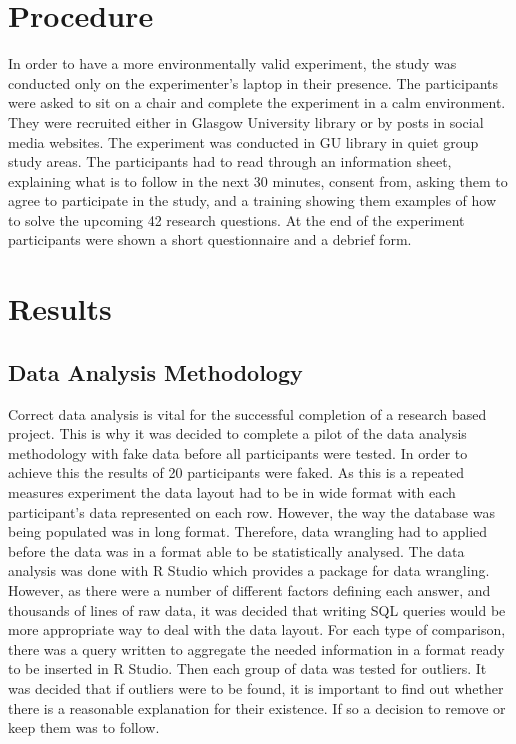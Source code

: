 \documentclass{l4proj}
\begin{document}
\section{Procedure}

In order to have a more environmentally valid experiment, the study was conducted only on the experimenter's laptop in their presence. The participants were asked to sit on a chair and complete the experiment in a calm environment. They were recruited either in Glasgow University library or by posts in social media websites. The experiment was conducted in GU library in quiet group study areas. The participants had to read through an information sheet, explaining what is to follow in the next 30 minutes, consent from, asking them to agree to participate in the study, and a training showing them examples of how to solve the upcoming 42 research questions. At the end of the experiment participants were shown a short questionnaire and a debrief form.


\section{Results}

\subsection{Data Analysis Methodology}

Correct data analysis is vital for the successful completion of a research based project. This is why it was decided to complete a pilot of the data analysis methodology with fake data before all participants were tested. In order to achieve this the results of 20 participants were faked. As this is a repeated measures experiment the data layout had to be in wide format with each participant's data represented on each row. However, the way the database was being populated was in long format. Therefore, data wrangling had to applied before the data was in a format able to be statistically analysed. The data analysis was done with R Studio which provides a package for data wrangling. However, as there were a number of different factors defining each answer, and thousands of lines of raw data, it was decided that writing SQL queries would be more appropriate way to deal with the data layout. For each type of comparison, there was a query written to aggregate the needed information in a format ready to be inserted in R Studio. Then each group of data was tested for outliers. It was decided that if outliers were to be found, it is important to find out whether there is a reasonable explanation for their existence. If so a decision to remove or keep them was to follow. 
\end{document}
